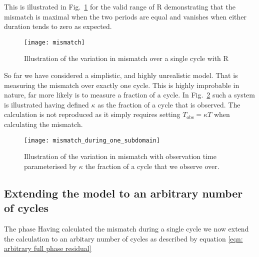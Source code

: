 This is illustrated in Fig.~\ref{fig: Lyne mismatch} for the valid range of R
demonstrating that the mismatch is maximal when the two periods are equal and
vanishes when either duration tends to zero as expected.

\begin{figure}[ht]
\centering
\texttt{[image: mismatch]}
\caption{Illustration of the variation in mismatch over a single cycle with R}
\label{fig: Lyne mismatch}
\end{figure}

So far we have considered a simplistic, and highly unrealistic model. That is
measuring the mismatch over exactly one cycle. This is highly improbable in nature,
far more likely is to measure a fraction of a cycle. In Fig.~\ref{fig: Lyne mismatch kappa}
such a system is illustrated having defined $\kappa$ as the fraction of a cycle that
is observed. The calculation is not reproduced as it simply requires setting 
$T_{\mathrm{obs}} = \kappa T$ when calculating the mismatch.

\begin{figure}[ht]
\centering
\texttt{[image: mismatch\_during\_one\_subdomain]}
\caption{Illustration of the variation in mismatch with observation time 
parameterised by $\kappa$ the fraction of a cycle that we observe over.}
\label{fig: Lyne mismatch kappa}
\end{figure}
\FloatBarrier

\subsection{Extending the model to an arbitrary number of cycles} The phase
Having calculated the mismatch during a single cycle we now extend the calculation
to an arbitary number of cycles as described by equation \eqref{eqn: arbitrary full phase residual}

